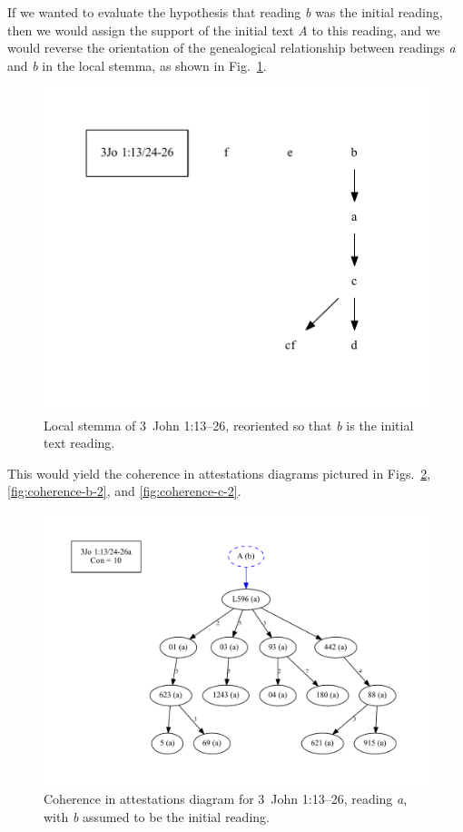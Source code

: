 \documentclass[a4paper, 12pt]{article}
\begin{document}
	\newpage
	
	If we wanted to evaluate the hypothesis that reading \emph{b} was the initial reading, then we would assign the support of the initial text \emph{A} to this reading, and we would reverse the orientation of the genealogical relationship between readings \emph{a} and \emph{b} in the local stemma, as shown in Fig.~\ref{fig:local-stemma-b-initial}.
	
	\begin{figure}[h!]
		\centering
		\includegraphics[scale=0.6666]{../graphics/B25K1V13U24-26-local-stemma-b-initial.pdf}
		\caption{Local stemma of 3~John 1:13–26, reoriented so that \emph{b} is the initial text reading.}
		\label{fig:local-stemma-b-initial}
	\end{figure}
	\noindent
	This would yield the coherence in attestations diagrams pictured in Figs.~\ref{fig:coherence-a-2}, \ref{fig:coherence-b-2}, and \ref{fig:coherence-c-2}.
	
	\begin{figure}
		\centering
		\includegraphics[scale=0.3333]{../graphics/B25K1V13U24-26Ra-coherence-attestations-2.pdf}
		\caption{Coherence in attestations diagram for 3~John 1:13–26, reading \emph{a}, with \emph{b} assumed to be the initial reading.}
		\label{fig:coherence-a-2}
	\end{figure}
	
\end{document}
